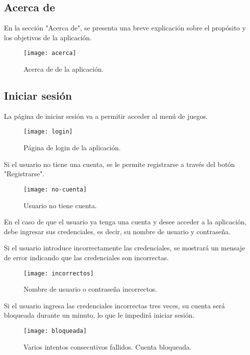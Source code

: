 \subsection{Acerca de}
En la sección "Acerca de", se presenta una breve explicación sobre el propósito y los objetivos de la aplicación.
\newpage
\begin{figure}[htb]
\centering
\texttt{[image: acerca]}
\caption{Acerca de de la aplicación.}
\label{fig:acerca}
\end{figure}

\subsection{Iniciar sesión}
La página de iniciar sesión va a permitir acceder al menú de juegos.

\begin{figure}[htb]
\centering
\texttt{[image: login]}
\caption{Página de login de la aplicación.}
\label{fig:login}
\end{figure}

Si el usuario no tiene una cuenta, se le permite registrarse a través del botón "Registrarse".

\begin{figure}[htb]
\centering
\texttt{[image: no-cuenta]}
\caption{Usuario no tiene cuenta.}
\label{fig:no-cuenta}
\end{figure}

En el caso de que el usuario ya tenga una cuenta y desee acceder a la aplicación, debe ingresar sus credenciales, es decir, su nombre de usuario y contraseña.

Si el usuario introduce incorrectamente las credenciales, se mostrará un mensaje de error indicando que las credenciales son incorrectas.
\newpage
\begin{figure}[htb]
\centering
\texttt{[image: incorrectos]}
\caption{Nombre de usuario o contraseña incorrectos.}
\label{fig:incorrectos}
\end{figure}

Si el usuario ingresa las credenciales incorrectas tres veces, su cuenta será bloqueada durante un minuto, lo que le impedirá iniciar sesión.
\begin{figure}[htb]
\centering
\texttt{[image: bloqueada]}
\caption{Varios intentos consecutivos fallidos. Cuenta bloqueada.}
\label{fig:bloqueada}
\end{figure}

